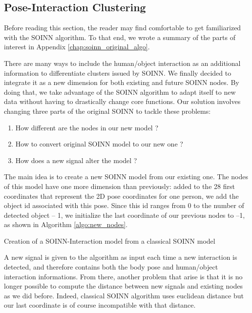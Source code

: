 \subsection{Pose-Interaction Clustering}
\label{section:pose-interaction_clustering}
Before reading this section, the reader may find comfortable to get familiarized with the SOINN algorithm. To that end, we wrote a summary of the parts of interest in Appendix \ref{chap:soinn_original_algo}.


There are many ways to include the human/object interaction as an additional information to differentiate clusters issued by SOINN. We finally decided to integrate it as a new dimension for both existing and future SOINN nodes. By doing that, we take advantage of the SOINN algorithm to adapt itself to new data without having to drastically change core functions. Our solution involves changing three parts of the original SOINN to tackle these problems:

\begin{enumerate}
    \item{How different are the nodes in our new model ?}
    \item{How to convert original SOINN model to our new one ?}
    \item{How does a new signal alter the model ?}
\end{enumerate}

The main idea is to create a new SOINN model from our existing one. The nodes of this model have one more dimension than previously: added to the 28 first coordinates that represent the 2D pose coordinates for one person, we add the object id associated with this pose. Since this id ranges from 0 to the number of detected object -- 1, we initialize the last coordinate of our previous nodes to --1, as shown in Algorithm \ref{algo:new_nodes}.

\begin{algorithm}[H]
    \label{algo:new_nodes}
    \caption{Creation of a SOINN-Interaction model from a classical SOINN model}
\end{algorithm}

A new signal is given to the algorithm as input each time a new interaction is detected, and therefore contains both the body pose and human/object interaction informations. From there, another problem that arise is that it is no longer possible to compute the distance between new signals and existing nodes as we did before. Indeed, classical SOINN algorithm uses euclidean distance but our last coordinate is of course incompatible with that distance. 

